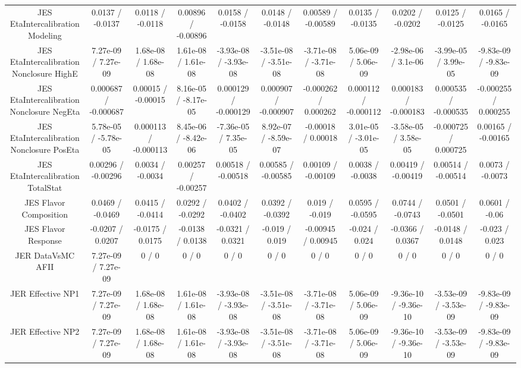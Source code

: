 \begin{table}[htbp]
\begin{center}
\begin{tabular}{|c|c|c|c|c|c|c|c|c|c|c|}
  JES EtaIntercalibration Modeling & 0.0137 / -0.0137 & 0.0118 / -0.0118 & 0.00896 / -0.00896 & 0.0158 / -0.0158 & 0.0148 / -0.0148 & 0.00589 / -0.00589 & 0.0135 / -0.0135 & 0.0202 / -0.0202 & 0.0125 / -0.0125 & 0.0165 / -0.0165 \\ 
  JES EtaIntercalibration Nonclosure HighE & 7.27e-09 / 7.27e-09 & 1.68e-08 / 1.68e-08 & 1.61e-08 / 1.61e-08 & -3.93e-08 / -3.93e-08 & -3.51e-08 / -3.51e-08 & -3.71e-08 / -3.71e-08 & 5.06e-09 / 5.06e-09 & -2.98e-06 / 3.1e-06 & -3.99e-05 / 3.99e-05 & -9.83e-09 / -9.83e-09 \\ 
  JES EtaIntercalibration Nonclosure NegEta & 0.000687 / -0.000687 & 0.00015 / -0.00015 & 8.16e-05 / -8.17e-05 & 0.000129 / -0.000129 & 0.000907 / -0.000907 & -0.000262 / 0.000262 & 0.000112 / -0.000112 & 0.000183 / -0.000183 & 0.000535 / -0.000535 & -0.000255 / 0.000255 \\ 
  JES EtaIntercalibration Nonclosure PosEta & 5.78e-05 / -5.78e-05 & 0.000113 / -0.000113 & 8.45e-06 / -8.42e-06 & -7.36e-05 / 7.35e-05 & 8.92e-07 / -8.59e-07 & -0.00018 / 0.00018 & 3.01e-05 / -3.01e-05 & -3.58e-05 / 3.58e-05 & -0.000725 / 0.000725 & 0.00165 / -0.00165 \\ 
  JES EtaIntercalibration TotalStat & 0.00296 / -0.00296 & 0.0034 / -0.0034 & 0.00257 / -0.00257 & 0.00518 / -0.00518 & 0.00585 / -0.00585 & 0.00109 / -0.00109 & 0.0038 / -0.0038 & 0.00419 / -0.00419 & 0.00514 / -0.00514 & 0.0073 / -0.0073 \\ 
  JES Flavor Composition & 0.0469 / -0.0469 & 0.0415 / -0.0414 & 0.0292 / -0.0292 & 0.0402 / -0.0402 & 0.0392 / -0.0392 & 0.019 / -0.019 & 0.0595 / -0.0595 & 0.0744 / -0.0743 & 0.0501 / -0.0501 & 0.0601 / -0.06 \\ 
  JES Flavor Response & -0.0207 / 0.0207 & -0.0175 / 0.0175 & -0.0138 / 0.0138 & -0.0321 / 0.0321 & -0.019 / 0.019 & -0.00945 / 0.00945 & -0.024 / 0.024 & -0.0366 / 0.0367 & -0.0148 / 0.0148 & -0.023 / 0.023 \\ 
  JER DataVsMC AFII & 7.27e-09 / 7.27e-09 & 0 / 0 & 0 / 0 & 0 / 0 & 0 / 0 & 0 / 0 & 0 / 0 & 0 / 0 & 0 / 0 & 0 / 0 \\ 
  JER Effective NP1 & 7.27e-09 / 7.27e-09 & 1.68e-08 / 1.68e-08 & 1.61e-08 / 1.61e-08 & -3.93e-08 / -3.93e-08 & -3.51e-08 / -3.51e-08 & -3.71e-08 / -3.71e-08 & 5.06e-09 / 5.06e-09 & -9.36e-10 / -9.36e-10 & -3.53e-09 / -3.53e-09 & -9.83e-09 / -9.83e-09 \\ 
  JER Effective NP2 & 7.27e-09 / 7.27e-09 & 1.68e-08 / 1.68e-08 & 1.61e-08 / 1.61e-08 & -3.93e-08 / -3.93e-08 & -3.51e-08 / -3.51e-08 & -3.71e-08 / -3.71e-08 & 5.06e-09 / 5.06e-09 & -9.36e-10 / -9.36e-10 & -3.53e-09 / -3.53e-09 & -9.83e-09 / -9.83e-09 \\ 

\end{tabular}
\end{center}
\end{table}
